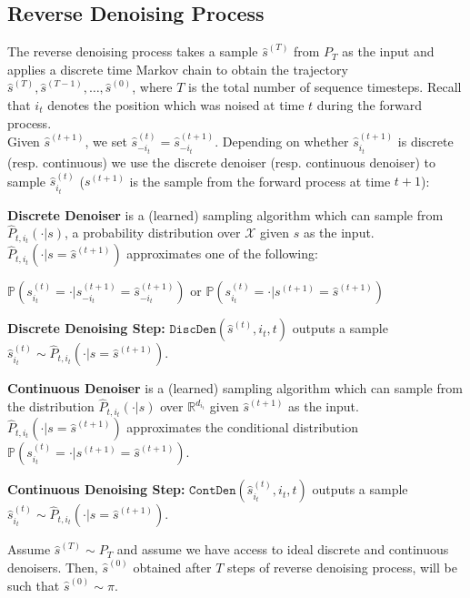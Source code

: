 \subsection{Reverse Denoising Process}

The reverse denoising process takes a sample $\hat{s}^{(T)}$ from $P_T$ 
as the input and applies a discrete time Markov chain to obtain the trajectory $\hat{s}^{(T)},\hat{s}^{(T-1)},\dots,\hat{s}^{(0)}$, where $T$ is the total number of sequence timesteps.  Recall that $i_t$ denotes the position which was noised at time $t$ during the forward process.\\

Given $\hat{s}^{(t+1)}$, we set $\hat{s}^{(t)}_{-i_t} = \hat{s}^{(t+1)}_{-i_t}$. Depending on whether $\hat{s}^{(t+1)}_{i_t}$ is discrete (resp. continuous) we use the discrete denoiser (resp. continuous denoiser) to sample $\hat{s}^{(t)}_{i_t}$ (${s}^{(t+1)}$ is the sample from the forward process at time $t+1$):

\textbf{Discrete Denoiser} is a (learned) sampling algorithm which can sample from $\hat{P}_{t,i_t}(\cdot|s)$, a probability distribution over $\mathcal{X}$ given $s$ as the input. $\hat{P}_{t,i_t}(\cdot|s = \hat{s}^{(t+1)})$ approximates one of the following:

$\mathbb{P}(s^{(t)}_{i_t} = \cdot| s^{(t+1)}_{-i_t} = \hat{s}^{(t+1)}_{-i_t})$ or $\mathbb{P}(s^{(t)}_{i_t} = \cdot| s^{(t+1)} = \hat{s}^{(t+1)})$

\textbf{Discrete Denoising Step:} $\texttt{DiscDen}(\hat{s}^{(t)},i_t,t)$ outputs a sample $\hat{s}^{(t)}_{i_t} \sim \hat{P}_{t,i_t}\left( \cdot | s = \hat{s}^{(t+1)} \right)$.


\textbf{Continuous Denoiser} is a (learned) sampling algorithm which can sample from the distribution $\hat{P}_{t,i_t}(\cdot|s)$ over $\mathbb{R}^{d_{i_t}}$ given $\hat{s}^{(t+1)}$ as the input. $\hat{P}_{t,i_t}(\cdot|s = \hat{s}^{(t+1)})$ approximates the conditional distribution $\mathbb{P}(s^{(t)}_{i_t} = \cdot| s^{(t+1)} = \hat{s}^{(t+1)})$.

\textbf{Continuous Denoising Step:} $\texttt{ContDen}(\hat{s}^{(t)}_{i_t},i_t,t)$ outputs a sample $\hat{s}^{(t)}_{i_t} \sim \hat{P}_{t,i_t}\left( \cdot |s =  \hat{s}^{(t+1)} \right)$.


\begin{lemma}
Assume $\hat{s}^{(T)} \sim P_T$ and assume we have access to ideal discrete and continuous denoisers. Then, $\hat{s}^{(0)}$ obtained after $T$ steps of reverse denoising process, will be such that $\hat{s}^{(0)} \sim \pi$.
\label{lemma:rev_process}
\end{lemma}

